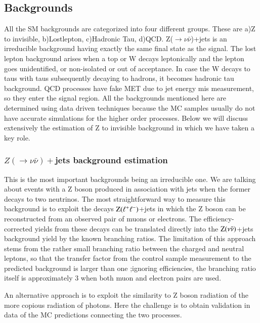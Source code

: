 \subsection{Backgrounds}


All the SM backgrounds are categorized into four different groups. These are a)Z to invisible, b)Lostlepton, c)Hadronic Tau, d)QCD. Z($\rightarrow \nu\bar{\nu}$)+jets is an irreducible background having exactly the same final state as the signal. The lost lepton background arises when a top or W decays leptonically and the lepton goes unidentified, or non-isolated or out of acceptance. In case the W decays to taus with taus subsequently decaying to hadrons, it becomes hadronic tau background. QCD processes have fake MET due to jet energy mis measurement, so they enter the signal region. All the backgrounds mentioned here are determined using data driven techniques because the MC samples usually do not have accurate simulations for  the higher order processes. Below we will discuss extensively the estimation of Z to invisible background in which we have taken a key role.  

\subsubsection{$Z(\rightarrow \nu \bar{\nu})+$jets background estimation}

This is the most important backgrounds being an irreducible one. We are talking about events with a Z boson produced in association with jets when the   former decays to two neutrinos. The most straightforward way to measure this background is
to exploit the decays $\rm Z(\ell^{+} \ell^{-})$+jets in which the Z boson can be
reconstructed from an observed pair of muons or electrons.  The
efficiency-corrected yields from these decays can be translated
directly into the $\rm Z(\nu \bar{\nu})$+jets background yield by the known branching
ratios.  The limitation of this approach stems from the rather small
branching ratio between the charged and neutral leptons, so that the
transfer factor from the control sample measurement to the predicted
background is larger than one ;ignoring efficiencies, the
branching ratio itself is approximately 3 when both muon and electron
pairs are used. 

An alternative approach is to exploit the similarity to Z boson
radiation of the more copious radiation of photons.  Here the
challenge is to obtain validation in data of the MC predictions
connecting the two processes.

